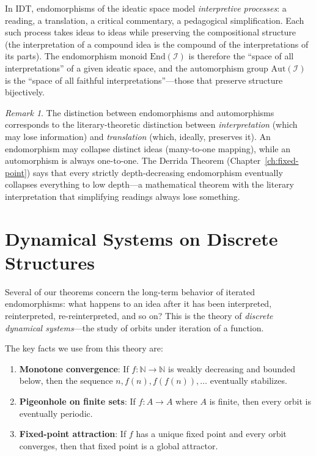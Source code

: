 \documentclass[11pt,openany]{book}
\theoremstyle{definition}
\theoremstyle{plain}
\theoremstyle{remark}
\newtheorem{remark}[axiom]{Remark}
\newcommand{\IS}{\mathcal{I}}               %
\begin{document}
In IDT, endomorphisms of the ideatic space model \emph{interpretive processes}: a reading, a translation, a critical commentary, a pedagogical simplification. Each such process takes ideas to ideas while preserving the compositional structure (the interpretation of a compound idea is the compound of the interpretations of its parts). The endomorphism monoid $\mathrm{End}(\IS)$ is therefore the ``space of all interpretations'' of a given ideatic space, and the automorphism group $\mathrm{Aut}(\IS)$ is the ``space of all faithful interpretations''---those that preserve structure bijectively.

\begin{remark}
The distinction between endomorphisms and automorphisms corresponds to the literary-theoretic distinction between \emph{interpretation} (which may lose information) and \emph{translation} (which, ideally, preserves it). An endomorphism may collapse distinct ideas (many-to-one mapping), while an automorphism is always one-to-one. The Derrida Theorem (Chapter~\ref{ch:fixed-point}) says that every strictly depth-decreasing endomorphism eventually collapses everything to low depth---a mathematical theorem with the literary interpretation that simplifying readings always lose something.
\end{remark}

\section{Dynamical Systems on Discrete Structures}

Several of our theorems concern the long-term behavior of iterated endomorphisms: what happens to an idea after it has been interpreted, reinterpreted, re-reinterpreted, and so on? This is the theory of \emph{discrete dynamical systems}---the study of orbits under iteration of a function.

The key facts we use from this theory are:

\begin{enumerate}
\item \textbf{Monotone convergence}: If $f : \mathbb{N} \to \mathbb{N}$ is weakly decreasing and bounded below, then the sequence $n, f(n), f(f(n)), \ldots$ eventually stabilizes.
\item \textbf{Pigeonhole on finite sets}: If $f : A \to A$ where $A$ is finite, then every orbit is eventually periodic.
\item \textbf{Fixed-point attraction}: If $f$ has a unique fixed point and every orbit converges, then that fixed point is a global attractor.
\end{enumerate}
\end{document}
